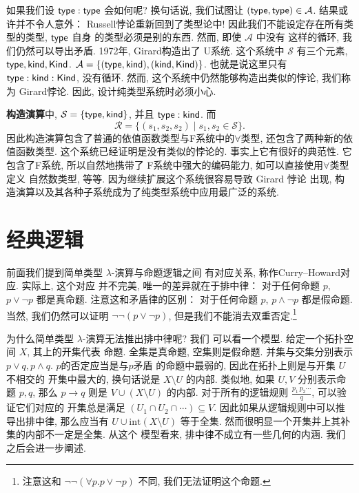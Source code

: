 如果我们设 \(\textsf{type} : \textsf{type}\) 会如何呢?
换句话说, 我们试图让 \((\textsf{type}, \textsf{type}) \in \mathcal A\).
结果或许并不令人意外： Russell悖论重新回到了类型论中!
因此我们不能设定存在所有类型的类型, \(\textsf{type}\) 自身
的类型必须是别的东西. 然而, 即使 \(\mathcal A\) 中没有
这样的循环, 我们仍然可以导出矛盾. 1972年, Girard构造出了
U系统.
这个系统中 \(\mathcal S\) 有三个元素,
\(\textsf{type}, \textsf{kind}, \textsf{Kind}\).
\(\mathcal A = \{(\textsf{type}, \textsf{kind}), (\textsf{kind}, \textsf{Kind})\}\).
也就是说这里只有 \(\textsf{type} : \textsf{kind} : \textsf{Kind}\),
没有循环. 然而, 这个系统中仍然能够构造出类似的悖论, 我们称为
Girard悖论. 因此, 设计纯类型系统时必须小心.

\textbf{构造演算}中, \(\mathcal S = \{\textsf{type}, \textsf{kind}\}\),
并且 \(\textsf{type} : \textsf{kind}\). 而
\[\mathcal R = \{(s_1,s_2,s_2) \mid s_1, s_2 \in \mathcal S\}.\]
因此构造演算包含了普通的依值函数类型与F系统中的\(\forall\)类型,
还包含了两种新的依值函数类型. 这个系统已经证明是没有类似的悖论的.
事实上它有很好的典范性. 它包含了F系统, 所以自然地携带了
F系统中强大的编码能力, 如可以直接使用\(\forall\)类型定义
自然数类型, 等等. 因为继续扩展这个系统很容易导致 Girard 悖论
出现, 构造演算以及其各种子系统成为了纯类型系统中应用最广泛的系统.

\section{经典逻辑}

前面我们提到简单类型 \(\lambda\)-演算与命题逻辑之间
有对应关系, 称作Curry--Howard对应. 实际上, 这个对应
并不完美, 唯一的差异就在于排中律： 对于任何命题 \(p\),
\(p \vee \neg p\) 都是真命题. 注意这和矛盾律的区别：
对于任何命题 \(p\), \(p \wedge \neg p\) 都是假命题.
当然, 我们仍然可以证明 \(\neg \neg (p \vee \neg p)\),
但是我们不能消去双重否定.\footnote{注意这和
\(\neg\neg (\forall p. p \vee \neg p)\) 不同,
我们无法证明这个命题.}

为什么简单类型 \(\lambda\)-演算无法推出排中律呢? 我们
可以看一个模型. 给定一个拓扑空间 \(X\), 其上的开集代表
命题. 全集是真命题, 空集则是假命题. 并集与交集分别表示
\(p\lor q, p\land q\). \(p\)的否定应当是与\(p\)矛盾
的命题中最弱的, 因此在拓扑上则是与开集 \(U\) 不相交的
开集中最大的, 换句话说是 \(X\setminus U\) 的内部.
类似地, 如果 \(U,V\) 分别表示命题 \(p,q\), 那么
\(p \to q\) 则是 \(V \cup (X \setminus U)\)
的内部. 对于所有的逻辑规则
\(\frac{p_1\,p_2\cdots}{q}\), 可以验证它们对应的
开集总是满足 \((U_1 \cap U_2 \cap \cdots)\subseteq V\).
因此如果从逻辑规则中可以推导出排中律, 那么应当有
\(U \cup \mathrm{int}(X\setminus U)\) 等于全集.
然而很明显一个开集并上其补集的内部不一定是全集. 从这个
模型看来, 排中律不成立有一些几何的内涵. 我们之后会进一步阐述.

